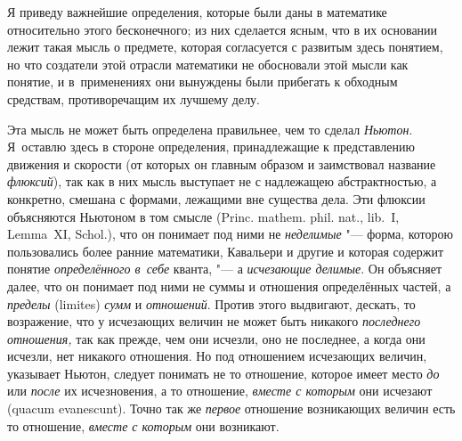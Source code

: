 Я приведу важнейшие определения, которые были даны в математике относительно
этого бесконечного; из них сделается ясным, что в их основании лежит такая
мысль о предмете, которая согласуется с развитым здесь понятием, но что
создатели этой отрасли математики не обосновали этой мысли как понятие, и
в~применениях они вынуждены были прибегать к обходным средствам,
противоречащим их лучшему делу.

Эта мысль не может быть определена правильнее, чем то сделал {\em Ньютон}.
Я~оставлю здесь в стороне определения, принадлежащие к представлению движения и
скорости (от которых он главным образом и заимствовал название {\em флюксий}),
так как в них мысль выступает не с надлежащею абстрактностью, а конкретно,
смешана с формами, лежащими вне существа дела. Эти флюксии объясняются Ньютоном
в том смысле (Princ. mathem. phil. nat., lib.~I, Lemma~XI, Schol.), что он
понимает под ними не {\em неделимые} "--- форма, которою пользовались более
ранние математики, Кавальери и другие и которая содержит понятие
{\em определённого в~себе} кванта, "--- а {\em исчезающие делимые}.
Он объясняет далее, что он понимает под ними не суммы и отношения определённых
частей, а {\em пределы} (limites) {\em сумм} и {\em отношений}. Против этого
выдвигают, дескать, то возражение, что у исчезающих величин не может быть
никакого {\em последнего отношения,} так как прежде, чем они исчезли, оно не
последнее, а когда они исчезли, нет никакого отношения. Но под отношением
исчезающих величин, указывает Ньютон, следует понимать не то отношение, которое
имеет место {\em до} или {\em после} их исчезновения, а то отношение,
{\em вместе с которым} они исчезают (quacum evanescunt). Точно так же
{\em первое} отношение возникающих величин есть то отношение,
{\em вместе с которым} они возникают.

